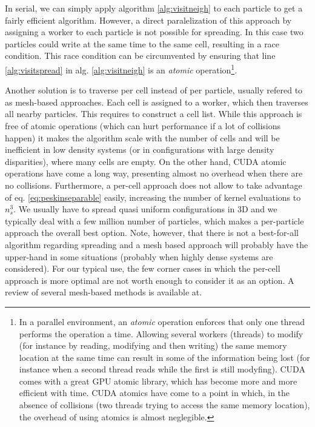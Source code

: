 \documentclass[ twoside,openright,titlepage,numbers=noenddot,%
headinclude,footinclude,cleardoublepage=empty,abstract=on,
BCOR=5mm,paper=a4,fontsize=11pt, dvipsnames
]{scrreprt}
\begin{document}
In serial, we can simply apply algorithm \ref{alg:visitneigh} to each particle to get a fairly efficient algorithm. However, a direct paralelization of this approach by assigning a worker to each particle is not possible for spreading. In this case two particles could write at the same time to the same cell, resulting in a race condition. This race condition can be circumvented by ensuring that line \ref{alg:visitspread} in alg. \ref{alg:visitneigh} is an \emph{atomic} operation\footnote{In a parallel environment, an \emph{atomic} operation enforces that only one thread performs the operation a time. Allowing several workers (threads) to modify (for instance by reading, modifying and then writing) the same memory location at the same time can result in some of the information being lost (for instance when a second thread reads while the first is still modyfing). CUDA comes with a great GPU atomic library, which has become more and more efficient with time. CUDA atomics have come to a point in which, in the absence of collisions (two threads trying to access the same memory location), the overhead of using atomics is almost neglegible.}.

Another solution is to traverse per cell instead of per particle, usually refered to as mesh-based approaches. Each cell is assigned to a worker, which then traverses all nearby particles. This requires to construct a cell list. While this approach is free of atomic operations (which can hurt performance if a lot of collisions happen) it makes the algorithm scale with the number of cells and will be inefficient in low density systems (or in configurations with large density disparities), where many cells are empty. On the other hand, CUDA atomic operations have come a long way, presenting almost no overhead when there are no collisions. Furthermore, a per-cell approach does not allow to take advantage of eq. \eqref{eq:peskinseparable} easily, increasing the number of kernel evaluations to $n_s^3$.
We usually have to spread quasi uniform configurations in 3D and we typically deal with a few million number of particles, which makes a per-particle approach the overall best option. Note, however, that there is not a best-for-all algorithm regarding spreading and a mesh based approach will probably have the upper-hand in some situations (probably when highly dense systems are considered).
For our typical use, the few corner cases in which the per-cell approach is more optimal are not worth enough to consider it as an option. A review of several mesh-based methods is available at\cite{Guo2015}.
\end{document}
